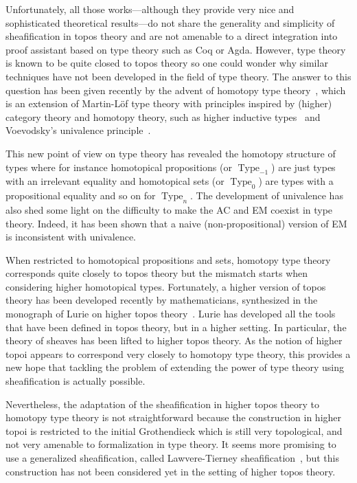 \documentclass[conference]{IEEEtran}
\DeclareMathOperator{\Type}{Type}
\begin{document}
Unfortunately, all those works---although they provide very nice and
sophisticated theoretical results---do not share the generality and
simplicity of sheafification in topos theory and are not amenable to a
direct integration into proof assistant based on type theory such as
Coq or Agda.  
%
However, type theory is known to be quite closed to topos theory so
one could wonder why similar techniques have not been developed in the
field of type theory. 
%
The answer to this question has been given recently by the advent of
homotopy type theory~\cite{hottbook}, which is an extension of
Martin-Löf type theory with principles inspired by (higher) category
theory and homotopy theory, such as higher inductive
types~\cite{lumsdaine2011higher,lumsdaine2013higher} and
Voevodsky's univalence principle~\cite{kapulkin2012simplicial}. 
%

This new point of view on type theory has revealed the
homotopy structure of types where for instance homotopical
propositions (or $\Type_{-1}$) are just types with an irrelevant equality and
homotopical sets (or $\Type_{0}$)  are types with a propositional
equality and so on for $\Type_{n}$.
%
The development of univalence has also shed some light on the
difficulty to make the AC and EM coexist in type theory. Indeed, it
has been shown that a naive (non-propositional) version of EM is
inconsistent with univalence.

When restricted to homotopical propositions and sets, homotopy type
theory corresponds quite closely to topos theory but the mismatch
starts when considering higher homotopical types.
%
Fortunately, a higher version of topos theory has been developed
recently by mathematicians, synthesized in the monograph of Lurie on
higher topos theory~\cite{lurie}. 
%
Lurie has developed all the tools that have been defined in
topos theory, but in a higher setting. In particular, the theory of
sheaves has been lifted to higher topos theory.
%
As the notion of higher topoi appears to correspond very closely
to homotopy type theory, this provides a new hope that tackling the problem of
extending the power of type theory using sheafification is actually possible.

Nevertheless, the adaptation of the sheafification in higher topos
theory to homotopy type theory is not straightforward because the
construction in higher topoi is restricted to the initial
Grothendieck which is still very topological, and not very amenable to
formalization in type theory. It seems more promising to use a
generalized sheafification, called Lawvere-Tierney
sheafification~\cite{maclanemoerdijk}, but this construction has not
been considered yet in the setting of higher topos theory. 
\end{document}
